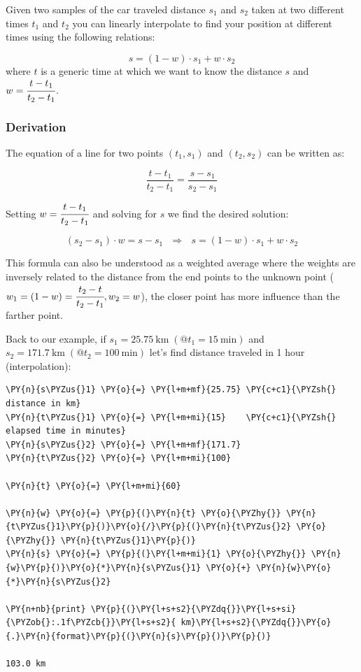 Given two samples of the car traveled distance \(s_1\) and \(s_2\) taken at two different times \(t_1\) and \(t_2\) you can linearly interpolate to find your position at different times using the following relations:

\[s = (1 - w)\cdot s_1 + w \cdot s_2\]
where $t$ is a generic time at which we want to know the distance $s$ and \(w = \cfrac{t - t_1}{t_2 - t_1}\).

\subsubsection{Derivation}
The equation of a line for two points
\((t_1, s_1)\) and \((t_2, s_2)\) can be written as:

\[\frac{t - t_1}{t_2 - t_1} = \frac{s - s_1}{s_2 - s_1}\]

Setting \(w = \cfrac{t - t_1}{t_2 - t_1}\) and solving for \(s\) we find the desired solution:

\[(s_2 - s_1)\cdot w = s - s_1~~~\Rightarrow~~~s = (1 - w)\cdot s_1 + w \cdot s_2\]

This formula can also be understood as a weighted average where the weights are inversely related to the distance from the end points to the unknown point ($w_1 = (1 - w) = \cfrac{t_2 - t}{t_2 -t_1}, w_2 = w$), the closer point has more influence than the farther point.

Back to our example, if
\(s_1 = 25.75~\mathrm{km}\;(@t_1 = 15~\mathrm{min})\) and
\(s_2 = 171.7~\mathrm{km}\;(@t_2 = 100~\mathrm{min})\) let's find distance traveled in 1 hour (interpolation):

\begin{tcolorbox}[breakable, size=fbox, boxrule=1pt, pad at break*=1mm,colback=cellbackground, colframe=cellborder]
\begin{Verbatim}[commandchars=\\\{\}]
\PY{n}{s\PYZus{}1} \PY{o}{=} \PY{l+m+mf}{25.75} \PY{c+c1}{\PYZsh{} distance in km}
\PY{n}{t\PYZus{}1} \PY{o}{=} \PY{l+m+mi}{15}    \PY{c+c1}{\PYZsh{} elapsed time in minutes}
\PY{n}{s\PYZus{}2} \PY{o}{=} \PY{l+m+mf}{171.7}
\PY{n}{t\PYZus{}2} \PY{o}{=} \PY{l+m+mi}{100}

\PY{n}{t} \PY{o}{=} \PY{l+m+mi}{60}

\PY{n}{w} \PY{o}{=} \PY{p}{(}\PY{n}{t} \PY{o}{\PYZhy{}} \PY{n}{t\PYZus{}1}\PY{p}{)}\PY{o}{/}\PY{p}{(}\PY{n}{t\PYZus{}2} \PY{o}{\PYZhy{}} \PY{n}{t\PYZus{}1}\PY{p}{)}
\PY{n}{s} \PY{o}{=} \PY{p}{(}\PY{l+m+mi}{1} \PY{o}{\PYZhy{}} \PY{n}{w}\PY{p}{)}\PY{o}{*}\PY{n}{s\PYZus{}1} \PY{o}{+} \PY{n}{w}\PY{o}{*}\PY{n}{s\PYZus{}2}

\PY{n+nb}{print} \PY{p}{(}\PY{l+s+s2}{\PYZdq{}}\PY{l+s+si}{\PYZob{}:.1f\PYZcb{}}\PY{l+s+s2}{ km}\PY{l+s+s2}{\PYZdq{}}\PY{o}{.}\PY{n}{format}\PY{p}{(}\PY{n}{s}\PY{p}{)}\PY{p}{)}

103.0 km
\end{Verbatim}
\end{tcolorbox}


